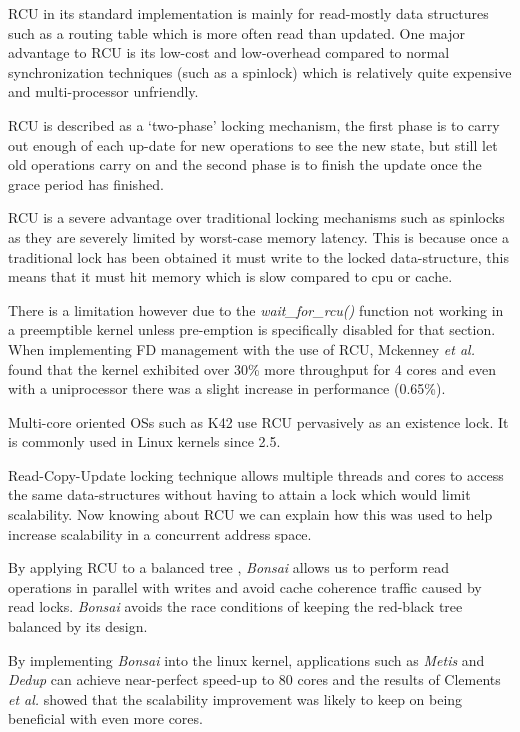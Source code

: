 \documentclass[journal]{IEEEtran}
\begin{document}
RCU in its standard implementation is mainly for read-mostly data structures such as a routing table which is more often read than updated. One major advantage to RCU is its low-cost and low-overhead compared to normal synchronization techniques (such as a spinlock) which is relatively quite expensive and multi-processor unfriendly.

RCU is described as a `two-phase' locking mechanism, the first phase is to carry out enough of each up-date for new operations to see the new state, but still let old operations carry on and the second phase is to finish the update once the grace period has finished.

RCU is a severe advantage over traditional locking mechanisms such as spinlocks as they are severely limited by worst-case memory latency. This is because once a traditional lock has been obtained it must write to the locked data-structure, this means that it must hit memory which is slow compared to cpu or cache.

There is a limitation however due to the \emph{wait\_for\_rcu()} function not working in a preemptible kernel unless pre-emption is specifically disabled for that section.
When implementing FD management with the use of RCU, Mckenney \emph{et al.} \cite{RCU} found that the kernel exhibited over 30\% more throughput for 4 cores and even with a uniprocessor there was a slight increase in performance (0.65\%).

Multi-core oriented OSs such as K42 \cite{K42} use RCU pervasively as an existence lock. It is commonly used in Linux kernels since 2.5.

Read-Copy-Update locking technique allows multiple threads and cores to access the same data-structures without having to attain a lock which would limit scalability. Now knowing about RCU we can explain how this was used to help increase scalability in a concurrent address space.

By applying RCU to a balanced tree \cite{Bonsai}, \emph{Bonsai} allows us to perform read operations in parallel with writes and avoid cache coherence traffic caused by read locks. \emph{Bonsai} avoids the race conditions of keeping the red-black tree balanced by its design.

By implementing \emph{Bonsai} into the linux kernel, applications such as \emph{Metis} and \emph{Dedup} can achieve near-perfect speed-up to 80 cores and the results of Clements \emph{et al.} showed that the scalability improvement was likely to keep on being beneficial with even more cores.
\end{document}
